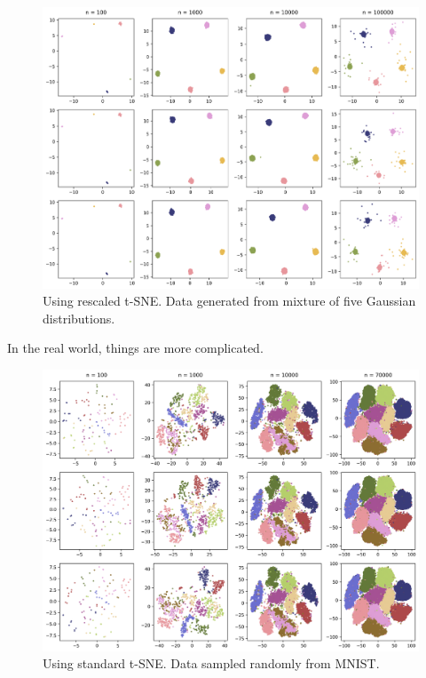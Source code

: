 \begin{figure}[h]
    \centering 
        \includegraphics[width=\linewidth]{figures/rescaled/Gaussian_Mixture_rescaled_embedding_grid.png}
        \caption{Using rescaled t-SNE. Data generated from mixture of five Gaussian distributions.}
    \label{fig:Gaussian-rescaled}
\end{figure}

In the real world, things are more complicated. 

\begin{figure}[h]
    \centering 
        \includegraphics[width=\linewidth]{figures/rescaled/MNIST_standard_embedding_grid.png}
        \caption{Using standard t-SNE. Data sampled randomly from MNIST.}
    \label{fig:MNIST-standard}
\end{figure}

